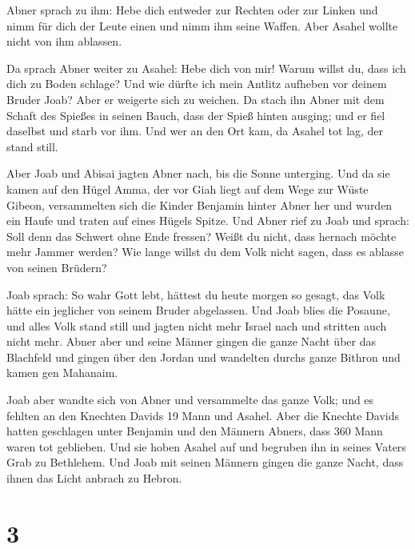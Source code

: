  Abner sprach zu ihm: Hebe dich entweder zur Rechten oder
zur Linken und nimm für dich der Leute einen und nimm ihm seine Waffen.
Aber Asahel wollte nicht von ihm ablassen.

 Da sprach Abner weiter zu Asahel: Hebe dich von mir!
Warum willst du, dass ich dich zu Boden schlage? Und wie dürfte ich mein
Antlitz aufheben vor deinem Bruder Joab?  Aber er
weigerte sich zu weichen. Da stach ihn Abner mit dem Schaft des Spießes
in seinen Bauch, dass der Spieß hinten ausging; und er fiel daselbst und
starb vor ihm. Und wer an den Ort kam, da Asahel tot lag, der stand
still.

 Aber Joab und Abisai jagten Abner nach, bis die Sonne
unterging. Und da sie kamen auf den Hügel Amma, der vor Giah liegt auf
dem Wege zur Wüste Gibeon,  versammelten sich die Kinder
Benjamin hinter Abner her und wurden ein Haufe und traten auf eines
Hügels Spitze.  Und Abner rief zu Joab und sprach: Soll
denn das Schwert ohne Ende fressen? Weißt du nicht, dass hernach möchte
mehr Jammer werden? Wie lange willst du dem Volk nicht sagen, dass es
ablasse von seinen Brüdern?

 Joab sprach: So wahr Gott lebt, hättest du heute morgen
so gesagt, das Volk hätte ein jeglicher von seinem Bruder abgelassen.
 Und Joab blies die Posaune, und alles Volk stand still
und jagten nicht mehr Israel nach und stritten auch nicht mehr.
 Abner aber und seine Männer gingen die ganze Nacht über
das Blachfeld und gingen über den Jordan und wandelten durchs ganze
Bithron und kamen gen Mahanaim.

 Joab aber wandte sich von Abner und versammelte das
ganze Volk; und es fehlten an den Knechten Davids 19 Mann und Asahel.
 Aber die Knechte Davids hatten geschlagen unter Benjamin
und den Männern Abners, dass 360 Mann waren tot geblieben.
 Und sie hoben Asahel auf und begruben ihn in seines
Vaters Grab zu Bethlehem. Und Joab mit seinen Männern gingen die ganze
Nacht, dass ihnen das Licht anbrach zu Hebron.

\hypertarget{section-2}{%
\section{3}\label{section-2}}

